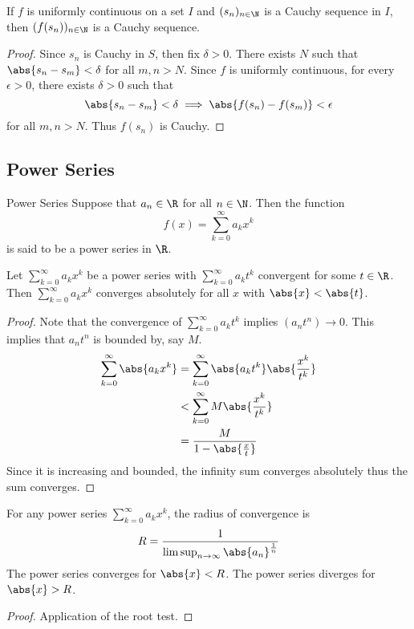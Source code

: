 \begin{thm}{}{} If $f$ is uniformly continuous on a set $I$ and $(s_n)_{n\in\N}$ is a Cauchy sequence in $I$, then $(f(s_n))_{n\in\N}$ is a Cauchy sequence. \tcbline
\begin{proof} Since $s_n$ is Cauchy in $S$, then fix $\delta>0$. There exists $N$ such that $\abs{s_n-s_m}<\delta$ for all $m,n>N$. Since $f$ is uniformly continuous, for every $\epsilon>0$, there exists $\delta>0$ such that $$\abs{s_n-s_m}<\delta\implies\abs{f(s_n)-f(s_m)}<\epsilon$$ for all $m,n>N$. Thus $f(s_n)$ is Cauchy. 
\end{proof}
\end{thm}

\subsection{Power Series}
\begin{defn}{Power Series}{} Suppose that $a_n\in\R$ for all $n\in\N$. Then the function $$f(x)=\sum_{k=0}^{\infty}a_kx^k$$ is said to be a power series in $\R$. 
\end{defn}

\begin{thm}{}{} Let $\sum_{k=0}^{\infty}a_kx^k$ be a power series with $\sum_{k=0}^{\infty}a_kt^k$ convergent for some $t\in\R$. Then $\sum_{k=0}^{\infty}a_kx^k$ converges absolutely for all $x$ with $\abs{x}<\abs{t}$. \tcbline
\begin{proof} Note that the convergence of $\sum_{k=0}^{\infty}a_kt^k$ implies $(a_nt^n)\to 0$. This implies that $a_nt^n$ is bounded by, say $M$. 
\begin{align*}
\sum_{k=0}^{\infty}\abs{a_kx^k}&=\sum_{k=0}^{\infty}\abs{a_kt^k}\abs{\frac{x^k}{t^k}}\\
&<\sum_{k=0}^{\infty}M\abs{\frac{x^k}{t^k}}\\
&=\frac{M}{1-\abs{\frac{x}{t}}}\\
\end{align*} Since it is increasing and bounded, the infinity sum converges absolutely thus the sum converges. 
\end{proof}
\end{thm}

\begin{thm}{}{} For any power series $\sum_{k=0}^\infty a_kx^k$, the radius of convergence is $$R=\frac{1}{\limsup_{n\to\infty}\abs{a_n}^{\frac{1}{n}}}$$ The power series converges for $\abs{x}<R$. The power series diverges for $\abs{x}>R$. \tcbline
\begin{proof} Application of the root test. 
\end{proof}
\end{thm}

